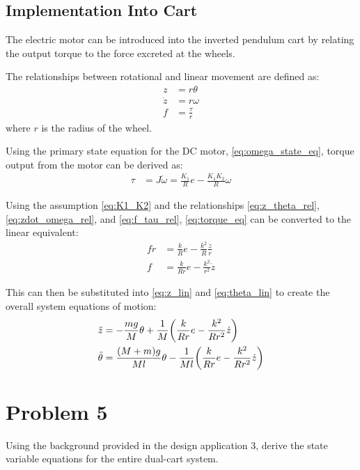 \documentclass[]{article}
\begin{document}
	\newpage	
	\subsection{Implementation Into Cart}\label{sec:p4_2}
		The electric motor can be introduced into the inverted pendulum cart by relating the output torque to the force excreted at the wheels.
		
		The relationships between rotational and linear movement are defined as:
		\begin{align}
			z &= r \theta \label{eq:z_theta_rel}\\
			\dot{z} &= r \omega \label{eq:zdot_omega_rel}\\
			f &= \frac{\tau}{r} \label{eq:f_tau_rel}
		\end{align}
		where $r$ is the radius of the wheel.
		
		Using the primary state equation for the DC motor, \eqref{eq:omega_state_eq}, torque output from the motor can be derived as:
		\begin{align}
			\tau &= J \dot{\omega} = \frac{K_1}{R} e - \frac{K_1 K_2}{R} \omega \label{eq:torque_eq}
		\end{align}
		
		Using the assumption \eqref{eq:K1_K2} and the relationships \eqref{eq:z_theta_rel}, \eqref{eq:zdot_omega_rel}, and \eqref{eq:f_tau_rel}, \eqref{eq:torque_eq} can be converted to the linear equivalent:
		\begin{align}
			f r &= \frac{k}{R} e - \frac{k^2}{R} \frac{\dot{z}}{r} \nonumber\\
			f &= \frac{k}{R r} e - \frac{k^2}{r^2} \dot{z} \label{eq:f_def}
		\end{align}
		
		This can then be substituted into \eqref{eq:z_lin} and \eqref{eq:theta_lin} to create the overall system equations of motion:
		\begin{align}
			\ddot{z} &= - \frac{mg}{M} \theta + \frac{1}{M} \qty(\frac{k}{Rr}e - \frac{k^2}{R r^2} \dot{z}) \label{eq:z_pend_eq}\\
			\ddot{\theta} &= \frac{(M+m)g}{M l} \theta - \frac{1}{M l} \qty(\frac{k}{R r} e - \frac{k^2}{R r^2}\dot{z}) \label{eq:theta_pend_eq}
		\end{align}
	
\newpage
\section{Problem 5}
	Using the background provided in the design application 3, derive the state variable equations for the entire dual-cart system.
\end{document}

